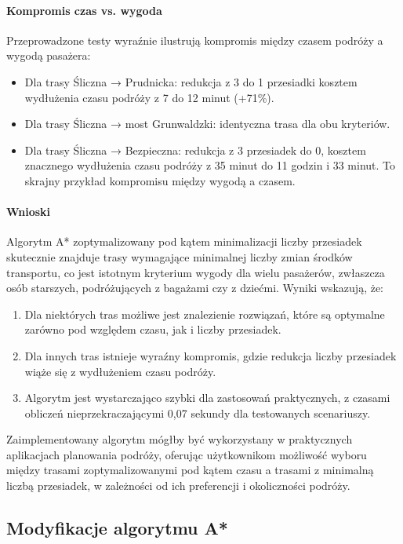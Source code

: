 \documentclass[12pt,a4paper]{article}
\begin{document}
\paragraph{Kompromis czas vs. wygoda}
Przeprowadzone testy wyraźnie ilustrują kompromis między czasem podróży a wygodą pasażera:

\begin{itemize}
    \item Dla trasy Śliczna → Prudnicka: redukcja z 3 do 1 przesiadki kosztem wydłużenia czasu podróży z 7 do 12 minut (+71\%).
    \item Dla trasy Śliczna → most Grunwaldzki: identyczna trasa dla obu kryteriów.
    \item Dla trasy Śliczna → Bezpieczna: redukcja z 3 przesiadek do 0, kosztem znacznego wydłużenia czasu podróży z 35 minut do 11 godzin i 33 minut. To skrajny przykład kompromisu między wygodą a czasem.
\end{itemize}

\paragraph{Wnioski}
Algorytm A* zoptymalizowany pod kątem minimalizacji liczby przesiadek skutecznie znajduje trasy wymagające minimalnej liczby zmian środków transportu, co jest istotnym kryterium wygody dla wielu pasażerów, zwłaszcza osób starszych, podróżujących z bagażami czy z dziećmi. Wyniki wskazują, że:

\begin{enumerate}
    \item Dla niektórych tras możliwe jest znalezienie rozwiązań, które są optymalne zarówno pod względem czasu, jak i liczby przesiadek.
    \item Dla innych tras istnieje wyraźny kompromis, gdzie redukcja liczby przesiadek wiąże się z wydłużeniem czasu podróży.
    \item Algorytm jest wystarczająco szybki dla zastosowań praktycznych, z czasami obliczeń nieprzekraczającymi 0,07 sekundy dla testowanych scenariuszy.
\end{enumerate}

Zaimplementowany algorytm mógłby być wykorzystany w praktycznych aplikacjach planowania podróży, oferując użytkownikom możliwość wyboru między trasami zoptymalizowanymi pod kątem czasu a trasami z minimalną liczbą przesiadek, w zależności od ich preferencji i okoliczności podróży.

\subsection{Modyfikacje algorytmu A*}
\end{document}
